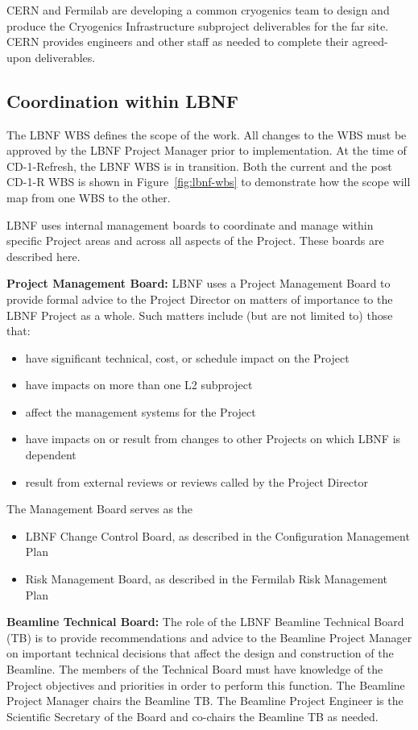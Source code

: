 CERN and Fermilab are developing a common cryogenics team to design and produce the Cryogenics Infrastructure subproject deliverables for the far site. CERN provides engineers and other staff as needed to complete their agreed-upon deliverables.  

\subsection{Coordination within LBNF}

The LBNF WBS defines the scope of the work. All changes to the WBS must be approved by the LBNF Project Manager prior to implementation. At the time of CD-1-Refresh, the LBNF WBS is in transition. Both the current and the post CD-1-R WBS is shown in Figure~\ref{fig:lbnf-wbs} to demonstrate how the scope will map from one WBS to the other. 

LBNF uses internal management boards to coordinate and manage within specific Project areas and across all aspects of the Project.  These boards are described here.


\textbf{Project Management Board:} LBNF uses a Project Management Board to provide formal advice to the Project Director on matters of importance to the LBNF Project as a whole. Such matters include (but are not limited to) those that:
\begin{itemize}
\item have significant technical, cost, or schedule impact on the Project
\item have impacts on more than one L2 subproject
\item affect the management systems for the Project
\item have impacts on or result from changes to other Projects on which LBNF is dependent
\item result from external reviews or reviews called by the Project Director
\end{itemize}
The Management Board serves as the
\begin{itemize}
\item LBNF Change Control Board, as described in the Configuration Management Plan \fixme{[ref]}
\item Risk Management Board, as described in the Fermilab Risk Management Plan  \fixme{[ref]}
\end{itemize}

\textbf{Beamline Technical Board:} The role of the LBNF Beamline Technical Board (TB) is to provide recommendations and advice to the Beamline Project Manager on important technical decisions that affect the design and construction of the Beamline. The members of the Technical Board must have knowledge of the Project objectives and priorities in order to perform this function. The Beamline Project Manager chairs the Beamline TB. The Beamline Project Engineer is the Scientific Secretary of the Board and co-chairs the Beamline TB as needed. 

